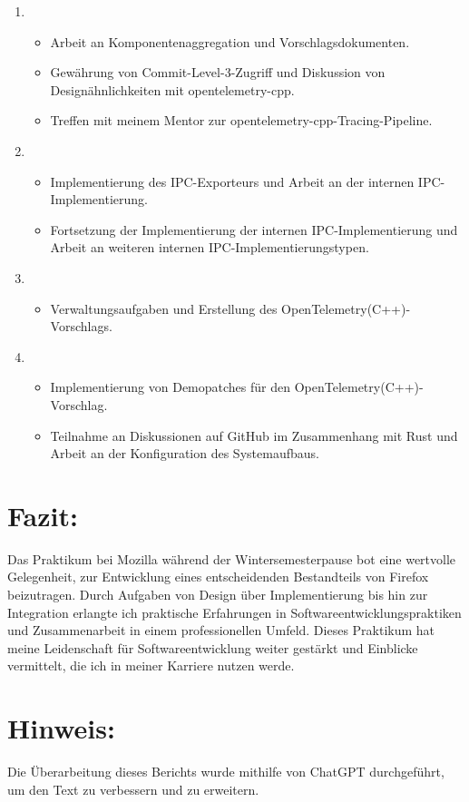 \documentclass{article}
\begin{document}
\begin{enumerate}[label=\textbf{Woche \arabic*:}]
\item {}            
    \begin{itemize}
       \item Arbeit an Komponentenaggregation und Vorschlagsdokumenten.
       \item Gewährung von Commit-Level-3-Zugriff und Diskussion von Designähnlichkeiten mit opentelemetry-cpp.
       \item Treffen mit meinem Mentor zur opentelemetry-cpp-Tracing-Pipeline.
   \end{itemize}

\item {}               
    \begin{itemize}
       \item Implementierung des IPC-Exporteurs und Arbeit an der internen IPC-Implementierung.
       \item Fortsetzung der Implementierung der internen IPC-Implementierung und Arbeit an weiteren internen IPC-Implementierungstypen.
   \end{itemize}

\item {}               
   \begin{itemize}
       \item Verwaltungsaufgaben und Erstellung des OpenTelemetry(C++)-Vorschlags.
   \end{itemize}

\item {}               
   \begin{itemize}
       \item Implementierung von Demopatches für den OpenTelemetry(C++)-Vorschlag.
       \item Teilnahme an Diskussionen auf GitHub im Zusammenhang mit Rust und Arbeit an der Konfiguration des Systemaufbaus.
   \end{itemize}

\end{enumerate}

\section*{Fazit:}
Das Praktikum bei Mozilla während der Wintersemesterpause bot eine wertvolle Gelegenheit, zur Entwicklung eines entscheidenden Bestandteils von Firefox beizutragen. Durch Aufgaben von Design über Implementierung bis hin zur Integration erlangte ich praktische Erfahrungen in Softwareentwicklungspraktiken und Zusammenarbeit in einem professionellen Umfeld. Dieses Praktikum hat meine Leidenschaft für Softwareentwicklung weiter gestärkt und Einblicke vermittelt, die ich in meiner Karriere nutzen werde.

\section*{Hinweis:}
Die Überarbeitung dieses Berichts wurde mithilfe von ChatGPT durchgeführt, um den Text zu verbessern und zu erweitern.
\end{document}
